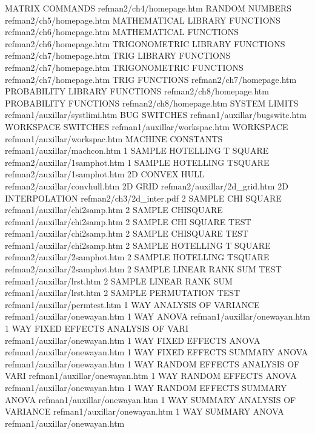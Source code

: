 MATRIX COMMANDS                         refman2/ch4/homepage.htm
RANDOM NUMBERS                          refman2/ch5/homepage.htm
MATHEMATICAL LIBRARY FUNCTIONS          refman2/ch6/homepage.htm
MATHEMATICAL FUNCTIONS                  refman2/ch6/homepage.htm
TRIGONOMETRIC LIBRARY FUNCTIONS         refman2/ch7/homepage.htm
TRIG LIBRARY FUNCTIONS                  refman2/ch7/homepage.htm
TRIGONOMETRIC FUNCTIONS                 refman2/ch7/homepage.htm
TRIG FUNCTIONS                          refman2/ch7/homepage.htm
PROBABILITY LIBRARY FUNCTIONS           refman2/ch8/homepage.htm
PROBABILITY FUNCTIONS                   refman2/ch8/homepage.htm
SYSTEM LIMITS                           refman1/auxillar/systlimi.htm
BUG SWITCHES                            refman1/auxillar/bugswitc.htm
WORKSPACE SWITCHES                      refman1/auxillar/workspac.htm
WORKSPACE                               refman1/auxillar/workspac.htm
MACHINE CONSTANTS                       refman1/auxillar/machcon.htm
1 SAMPLE HOTELLING T SQUARE             refman2/auxillar/1samphot.htm
1 SAMPLE HOTELLING TSQUARE              refman2/auxillar/1samphot.htm
2D CONVEX HULL                          refman2/auxillar/convhull.htm
2D GRID                                 refman2/auxillar/2d_grid.htm
2D INTERPOLATION                        refman2/ch3/2d_inter.pdf
2 SAMPLE CHI SQUARE                     refman1/auxillar/chi2samp.htm
2 SAMPLE CHISQUARE                      refman1/auxillar/chi2samp.htm
2 SAMPLE CHI SQUARE TEST                refman1/auxillar/chi2samp.htm
2 SAMPLE CHISQUARE TEST                 refman1/auxillar/chi2samp.htm
2 SAMPLE HOTELLING T SQUARE             refman2/auxillar/2samphot.htm
2 SAMPLE HOTELLING TSQUARE              refman2/auxillar/2samphot.htm
2 SAMPLE LINEAR RANK SUM TEST           refman1/auxillar/lrst.htm
2 SAMPLE LINEAR RANK SUM                refman1/auxillar/lrst.htm
2 SAMPLE PERMUTATION TEST               refman1/auxillar/permtest.htm
1 WAY ANALYSIS OF VARIANCE              refman1/auxillar/onewayan.htm
1 WAY ANOVA                             refman1/auxillar/onewayan.htm
1 WAY FIXED EFFECTS ANALYSIS OF VARI    refman1/auxillar/onewayan.htm
1 WAY FIXED EFFECTS ANOVA               refman1/auxillar/onewayan.htm
1 WAY FIXED EFFECTS SUMMARY ANOVA       refman1/auxillar/onewayan.htm
1 WAY RANDOM EFFECTS ANALYSIS OF VARI   refman1/auxillar/onewayan.htm
1 WAY RANDOM EFFECTS ANOVA              refman1/auxillar/onewayan.htm
1 WAY RANDOM EFFECTS SUMMARY ANOVA      refman1/auxillar/onewayan.htm
1 WAY SUMMARY ANALYSIS OF VARIANCE      refman1/auxillar/onewayan.htm
1 WAY SUMMARY ANOVA                     refman1/auxillar/onewayan.htm
